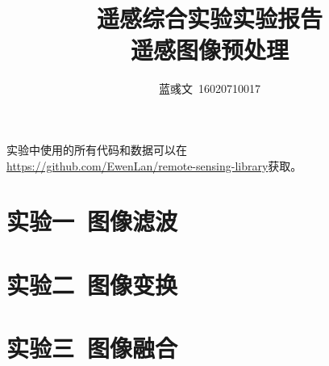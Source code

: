 \documentclass[hyperref, UTF8]{ctexart}
\title{遥感综合实验实验报告\\遥感图像预处理}
\author{蓝彧文~16020710017}
\begin{document}
	\maketitle
	\tableofcontents
	\newpage
	实验中使用的所有代码和数据可以在\\ \url{https://github.com/EwenLan/remote-sensing-library}获取。
	\section{实验一~图像滤波}
	
	\section{实验二~图像变换}
	
	\section{实验三~图像融合}
	
\end{document}
